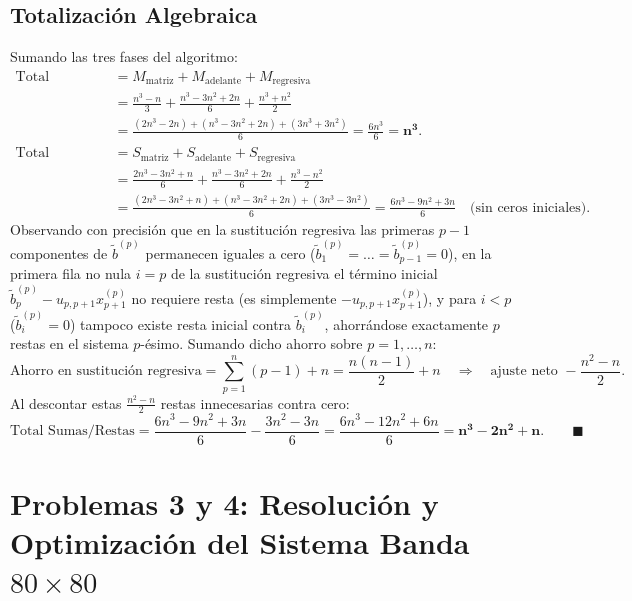 \documentclass[11pt,letterpaper]{article}
\begin{document}
\subsection{Totalización Algebraica}
Sumando las tres fases del algoritmo:
\begin{align}
    \text{Total Mul/Div} &= M_{\text{matriz}} + M_{\text{adelante}} + M_{\text{regresiva}} \nonumber \\
    &= \frac{n^3 - n}{3} + \frac{n^3 - 3n^2 + 2n}{6} + \frac{n^3 + n^2}{2} \nonumber \\
    &= \frac{(2n^3 - 2n) + (n^3 - 3n^2 + 2n) + (3n^3 + 3n^2)}{6} = \frac{6n^3}{6} = \mathbf{n^3}. \\[0.2cm]
    \text{Total Sumas/Restas} &= S_{\text{matriz}} + S_{\text{adelante}} + S_{\text{regresiva}} \nonumber \\
    &= \frac{2n^3 - 3n^2 + n}{6} + \frac{n^3 - 3n^2 + 2n}{6} + \frac{n^3 - n^2}{2} \nonumber \\
    &= \frac{(2n^3 - 3n^2 + n) + (n^3 - 3n^2 + 2n) + (3n^3 - 3n^2)}{6} = \frac{6n^3 - 9n^2 + 3n}{6} \quad \text{(sin ceros iniciales)}.
\end{align}
Observando con precisión que en la sustitución regresiva las primeras $p - 1$ componentes de $\tilde{b}^{(p)}$ permanecen iguales a cero ($\tilde{b}_1^{(p)} = \dots = \tilde{b}_{p-1}^{(p)} = 0$), en la primera fila no nula $i = p$ de la sustitución regresiva el término inicial $\tilde{b}_p^{(p)} - u_{p,p+1}x_{p+1}^{(p)}$ no requiere resta (es simplemente $-u_{p,p+1}x_{p+1}^{(p)}$), y para $i < p$ ($\tilde{b}_i^{(p)} = 0$) tampoco existe resta inicial contra $\tilde{b}_i^{(p)}$, ahorrándose exactamente $p$ restas en el sistema $p$-ésimo. Sumando dicho ahorro sobre $p = 1, \dots, n$:
\begin{equation}
    \text{Ahorro en sustitución regresiva} = \sum_{p=1}^{n} (p - 1) + n = \frac{n(n-1)}{2} + n \quad \Longrightarrow \quad \text{ajuste neto } -\frac{n^2 - n}{2}.
\end{equation}
Al descontar estas $\frac{n^2 - n}{2}$ restas innecesarias contra cero:
\begin{equation}
    \text{Total Sumas/Restas} = \frac{6n^3 - 9n^2 + 3n}{6} - \frac{3n^2 - 3n}{6} = \frac{6n^3 - 12n^2 + 6n}{6} = \mathbf{n^3 - 2n^2 + n}. \qquad \blacksquare
\end{equation}

\section{Problemas 3 y 4: Resolución y Optimización del Sistema Banda $80 \times 80$}
\end{document}
